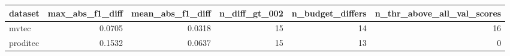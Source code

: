 \begin{tabular}{lrrrrr}
\toprule
 dataset &  max\_abs\_f1\_diff &  mean\_abs\_f1\_diff &  n\_diff\_gt\_002 &  n\_budget\_differs &  n\_thr\_above\_all\_val\_scores \\
\midrule
   mvtec &           0.0705 &            0.0318 &             15 &                14 &                          16 \\
proditec &           0.1532 &            0.0637 &             15 &                13 &                           0 \\
\bottomrule
\end{tabular}
